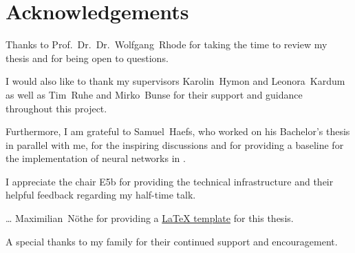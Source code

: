 \chapter*{Acknowledgements}

Thanks to Prof.~Dr.~Dr.~Wolfgang~Rhode for
  taking the time to review my thesis
  and for being open to questions.

I would also like to thank
my supervisors
  Karolin~Hymon and
  Leonora~Kardum
as well as
  Tim~Ruhe and
  Mirko~Bunse
for their support and guidance throughout this project.

Furthermore,
I am grateful to Samuel~Haefs,
  who worked on his Bachelor's thesis in parallel with me,
for the inspiring discussions
and for providing a baseline for the implementation of neural networks in \dsea{}.

I appreciate the chair E5b for providing the technical infrastructure
and their helpful feedback regarding my half-time talk.

… Maximilian~Nöthe for providing a \href{https://github.com/maxnoe/tudothesis}{\LaTeX{} template} for this thesis.


A special thanks to my family for their continued support and encouragement.
